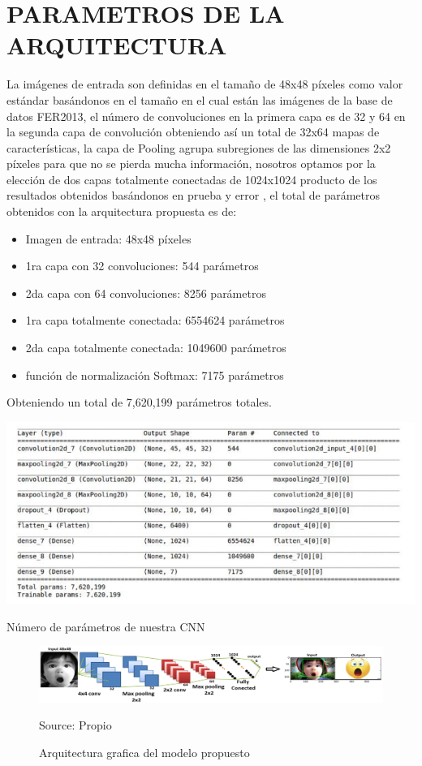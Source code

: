 \section{PARAMETROS DE LA ARQUITECTURA}
La imágenes de entrada son definidas en el tamaño de 48x48 píxeles como valor
estándar basándonos en el tamaño en el cual están las imágenes de la base de datos
FER2013, el número de convoluciones en la primera capa es de 32 y 64 en la segunda
capa de convolución obteniendo así un total de 32x64 mapas de características, la capa
de Pooling agrupa subregiones de las dimensiones 2x2 píxeles para que no se pierda
mucha información, nosotros optamos por la elección de dos capas totalmente conectadas
de 1024x1024 producto de los resultados obtenidos basándonos en prueba y error , el total
de parámetros obtenidos con la arquitectura propuesta es de:

\begin{itemize}
\item Imagen de entrada: 48x48 píxeles
\item 1ra capa con 32 convoluciones: 544 parámetros
\item 2da capa con 64 convoluciones: 8256 parámetros
\item 1ra capa totalmente conectada: 6554624 parámetros
\item 2da capa totalmente conectada: 1049600 parámetros
\item función de normalización Softmax: 7175 parámetros
\end{itemize}
Obteniendo un total de 7,620,199 parámetros totales.

\begin{table}[H]
    \centering
    \includegraphics[width=140mm]{./Imagenes/parametros.png} 
    \caption{Número de parámetros de nuestra CNN}
    \label{tab:parametros}
\end{table}


\begin{figure}[H]
		\centering
		\includegraphics[width=180mm]{./Imagenes/arquitectura_CNN_grafico.png}
		\caption{Arquitectura grafica del modelo propuesto}
		Source: Propio
		\label{fig:arquitectura_CNN_grafico}
\end{figure}
	
